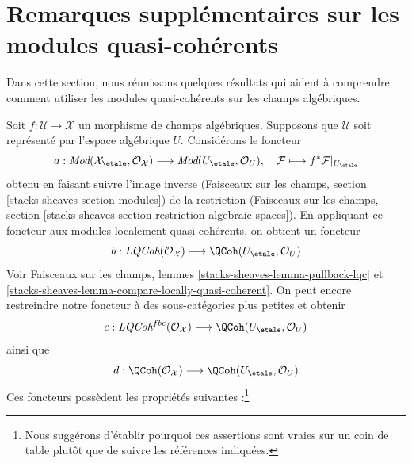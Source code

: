 \section{Remarques supplémentaires sur les modules quasi-cohérents}
\label{section-further-remarks}

\noindent
Dans cette section, nous réunissons quelques résultats qui aident à comprendre comment
utiliser les modules quasi-cohérents sur les champs algébriques.

\medskip\noindent
Soit $f : \mathcal{U} \to \mathcal{X}$ un morphisme de champs algébriques.
Supposons que $\mathcal{U}$ soit représenté par l'espace algébrique $U$.
Considérons le foncteur
$$
a :
\textit{Mod}(\mathcal{X}_\etale, \mathcal{O}_\mathcal{X})
\longrightarrow
\textit{Mod}(U_\etale, \mathcal{O}_U),\quad
\mathcal{F}
\longmapsto
f^*\mathcal{F}|_{U_\etale}
$$
obtenu en faisant suivre l'image inverse (Faisceaux sur les champs, section
\ref{stacks-sheaves-section-modules}) de la restriction
(Faisceaux sur les champs, section
\ref{stacks-sheaves-section-restriction-algebraic-spaces}).
En appliquant ce foncteur aux modules localement quasi-cohérents, on obtient un foncteur
$$
b : \textit{LQCoh}(\mathcal{O}_\mathcal{X})
\longrightarrow
\QCoh(U_\etale, \mathcal{O}_U)
$$
Voir Faisceaux sur les champs, lemmes \ref{stacks-sheaves-lemma-pullback-lqc} et
\ref{stacks-sheaves-lemma-compare-locally-quasi-coherent}.
On peut encore restreindre notre foncteur à des sous-catégories plus petites et obtenir
$$
c :
\textit{LQCoh}^{fbc}(\mathcal{O}_\mathcal{X})
\longrightarrow
\QCoh(U_\etale, \mathcal{O}_U)
$$
ainsi que
$$
d :
\QCoh(\mathcal{O}_\mathcal{X})
\longrightarrow
\QCoh(U_\etale, \mathcal{O}_U)
$$
Ces foncteurs possèdent les propriétés suivantes :\footnote{Nous suggérons
d'établir pourquoi ces assertions sont vraies sur un coin de table plutôt que de
suivre les références indiquées.}
